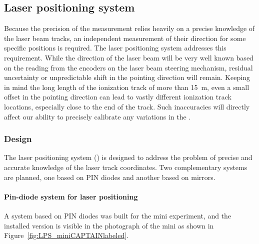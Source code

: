 
\subsection{Laser positioning system}
\label{sec:calib-laser-pos}

Because the precision of the \efield measurement relies heavily on a precise knowledge of the laser beam tracks, an independent measurement of their direction for some specific positions is required. The laser positioning system addresses this requirement.
While the direction of the laser beam will be very well known based on the reading from the encoders on the laser beam steering mechanism,  residual uncertainty or unpredictable shift in the pointing direction will remain. 
Keeping in mind the long length of the ionization track of more than \SI{15}{\m}, even a small offset in the pointing direction can lead to vastly different ionization track locations, especially close to the end of the track. Such inaccuracies will directly affect our ability to precisely calibrate any variations in the \efield.

\subsubsection{Design}

The laser positioning system () is designed to address the problem of precise and accurate knowledge of the laser track coordinates. %
Two complementary systems are planned, one based on PIN diodes and another based on mirrors.

\paragraph{Pin-diode system for laser positioning}

A system based on PIN  diodes 
was built for the mini experiment,  and the installed version is visible in the photograph of the mini  as shown in  Figure~\ref{fig:LPS_miniCAPTAINlabeled}.  


